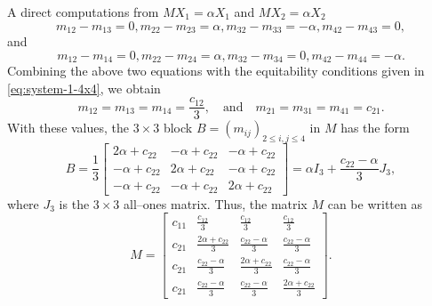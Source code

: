 \documentclass[12pt,twoside]{article}
\begin{document}
	A direct computations from $M X_1=\alpha X_1$ and $M X_2=\alpha X_2$
	$$
		m_{12}-m_{13}=0,		m_{22}-m_{23}=\alpha,
		m_{32}-m_{33}=-\alpha,		m_{42}-m_{43}=0,
	$$
	and
	$$
		m_{12}-m_{14}=0,
		m_{22}-m_{24}=\alpha,
		m_{32}-m_{34}=0,
		m_{42}-m_{44}=-\alpha.
	$$
	Combining the above two equations with the equitability conditions given in	\eqref{eq:system-1-4x4}, we obtain
	$$
	m_{12}=m_{13}=m_{14}=\frac{c_{12}}{3}, \quad \text{and}\quad m_{21}=m_{31}=m_{41}=c_{21}.
	$$
	With these values, the $3\times 3$ block $B=(m_{ij})_{2\le i,j\le 4}$ in $M$ has the form
	\begin{equation}\label{eq:B-structure}
		B
		=
		\frac{1}{3}
		\begin{bmatrix}
			2\alpha + c_{22} & -\alpha + c_{22} & -\alpha + c_{22}\\
			-\alpha + c_{22} & 2\alpha + c_{22} & -\alpha + c_{22}\\
			-\alpha + c_{22} & -\alpha + c_{22} & 2\alpha + c_{22}
		\end{bmatrix}
		=
		\alpha I_3 + \frac{c_{22}-\alpha}{3}J_3,
	\end{equation}
	where $J_3$ is the $3\times 3$ all--ones matrix.
	Thus, the matrix $M$ can be written as
	\begin{equation}\label{eq:M-4x4-final}
		M
		=
		\begin{bmatrix}
			c_{11} & \frac{c_{12}}{3} & \frac{c_{12}}{3} & \frac{c_{12}}{3}\\
			c_{21} & \frac{2\alpha+c_{22}}{3} & \frac{c_{22}-\alpha}{3} & \frac{c_{22}-\alpha}{3}\\
			c_{21} & \frac{c_{22}-\alpha}{3} & \frac{2\alpha+c_{22}}{3} & \frac{c_{22}-\alpha}{3}\\
			c_{21} & \frac{c_{22}-\alpha}{3} & \frac{c_{22}-\alpha}{3} & \frac{2\alpha+c_{22}}{3}
		\end{bmatrix}.
	\end{equation}
	
\end{document}
